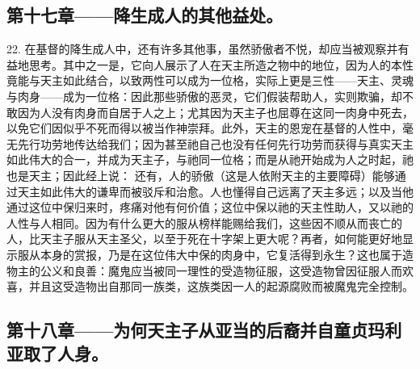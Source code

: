 \subsection{第十七章——降生成人的其他益处。}

22. 在基督的降生成人中，还有许多其他事，虽然骄傲者不悦，却应当被观察并有益地思考。其中之一是，它向人展示了人在天主所造之物中的地位，因为人的本性竟能与天主如此结合，以致两性可以成为一位格，实际上更是三性——天主、灵魂与肉身——成为一位格：因此那些骄傲的恶灵，它们假装帮助人，实则欺骗，却不敢因为人没有肉身而自居于人之上；尤其因为天主子也屈尊在这同一肉身中死去，以免它们因似乎不死而得以被当作神崇拜。此外，天主的恩宠在基督的人性中，毫无先行功劳地传达给我们；因为甚至祂自己也没有任何先行功劳而获得与真实天主如此伟大的合一，并成为天主子，与祂同一位格；而是从祂开始成为人之时起，祂也是天主；因此经上说： 还有，人的骄傲（这是人依附天主的主要障碍）能够通过天主如此伟大的谦卑而被驳斥和治愈。人也懂得自己远离了天主多远；以及当他通过这位中保归来时，疼痛对他有何价值；这位中保以祂的天主性助人，又以祂的人性与人相同。因为有什么更大的服从榜样能赐给我们，这些因不顺从而丧亡的人，比天主子服从天主圣父，以至于死在十字架上更大呢？再者，如何能更好地显示服从本身的赏报，乃是在这位伟大中保的肉身中，它复活得到永生？这也属于造物主的公义和良善：魔鬼应当被同一理性的受造物征服，这受造物曾因征服人而欢喜，并且这受造物出自那同一族类，这族类因一人的起源腐败而被魔鬼完全控制。\par


\subsection{第十八章——为何天主子从亚当的后裔并自童贞玛利亚取了人身。}

